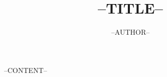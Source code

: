 \documentclass[12pt]{article}
\title{--TITLE--}
\author{--AUTHOR--}
\begin{document}
\def\showCor{0}

--CONTENT--
\end{document}
